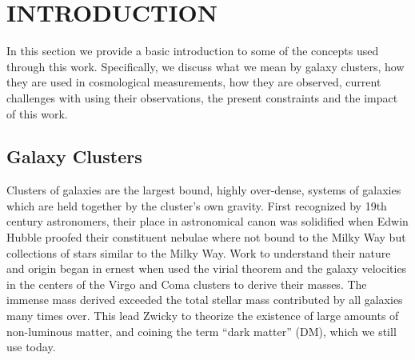 %
%
%



\pagestyle{plain} %
\setcounter{page}{1}


\chapter[\uppercase{Introduction}]{\uppercase{Introduction}}

In this section we provide a basic introduction to some of the concepts used through this work. Specifically, we discuss what we mean by galaxy clusters, how they are used in cosmological measurements, how they are observed, current challenges with using their observations, the present constraints and the impact of this work.

\section{Galaxy Clusters}
Clusters of galaxies are the largest bound, highly over-dense, systems of galaxies which are held together by the cluster's own gravity. First recognized by 19th century astronomers, their place in astronomical canon was solidified when Edwin Hubble proofed their constituent nebulae where not bound to the Milky Way \citep{Hubble1926} but collections of stars similar to the Milky Way. Work to understand their nature and origin began in ernest when \cite{Hubble1931} used the virial theorem and the galaxy velocities in the centers of the Virgo \citep{Smith1936} and Coma \citep{Zwicky1933} clusters to derive their masses. The immense mass derived exceeded the total stellar mass contributed by all galaxies many times over. This lead Zwicky to theorize the existence of large amounts of non-luminous matter, and coining the term ``dark matter'' (DM), which we still use today.  

